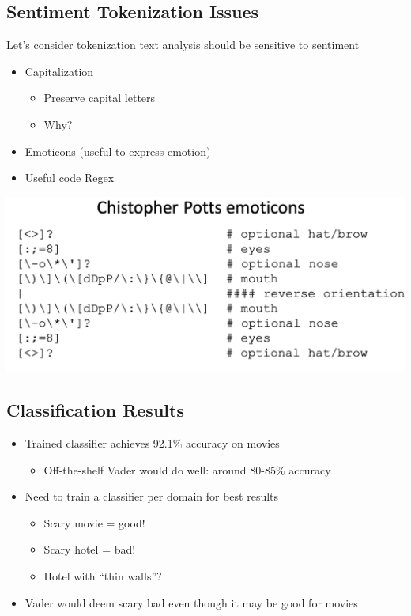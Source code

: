 \documentclass[11pt]{article}
\theoremstyle{definition}
\begin{document}
\subsection{Sentiment Tokenization Issues}
Let’s consider tokenization
text analysis should be
sensitive to sentiment

\begin{itemize}
  \item Capitalization
  \begin{itemize}
    \item Preserve capital letters
    \item Why?
  \end{itemize}
  \item Emoticons (useful to express emotion)
  \item Useful code Regex
\end{itemize}
\includegraphics[width=\textwidth/2]{13.png}

\subsection{Classification Results}
\begin{itemize}
  \item Trained classifier achieves 92.1\% accuracy on movies
  \begin{itemize}
    \item Off-the-shelf Vader would do well: around 80-85\% accuracy
  \end{itemize}
\end{itemize}
\begin{itemize}
  \item Need to train a classifier per domain for best results
  \begin{itemize}
    \item Scary movie = good!
    \item Scary hotel = bad!
    \item Hotel with “thin walls”?  
  \end{itemize}
  \item Vader would deem scary bad even though it may be good for movies
\end{itemize}
\end{document}
